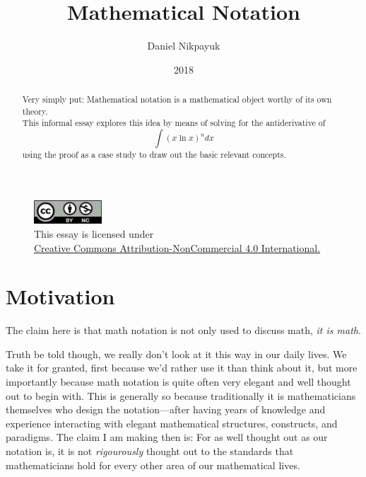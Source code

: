 \documentclass[twoside]{article}
\title{Mathematical Notation}
\author{Daniel Nikpayuk}
\date{2018}
\begin{document}
\maketitle
\thispagestyle{empty}

\begin{figure}[h]
\centering
\includegraphics[width=1in]{../../../cc-by-nc.png}\\[0.1in]
\tiny This essay is licensed under \\
\href{http://creativecommons.org/licenses/by-nc/4.0/}
{Creative Commons Attribution-NonCommercial 4.0 International.}\\[0.3in]
\end{figure}

\begin{abstract} %
Very simply put: Mathematical notation is a mathematical object worthy of its own theory.\\[0.1cm]

This informal essay explores this idea by means of solving for the antiderivative of
$$ \int (x\ln x)^n dx $$
using the proof as a case study to draw out the basic relevant concepts.
\end{abstract}

\section*{Motivation} %

The claim here is that math notation is not only used to discuss math, \emph{it is math}.

Truth be told though, we really don't look at it this way in our daily lives. We take it for granted, first because we'd rather
use it than think about it, but more importantly because math notation is quite often very elegant and well thought out to begin with.
This is generally so because traditionally it is mathematicians themselves who design the notation---after having years of knowledge
and experience interacting with elegant mathematical structures, constructs, and paradigms. The claim I am making then is:
For as well thought out as our notation is, it is not \emph{rigourously} thought out to the standards that mathematicians
hold for every other area of our mathematical lives.
\end{document}
